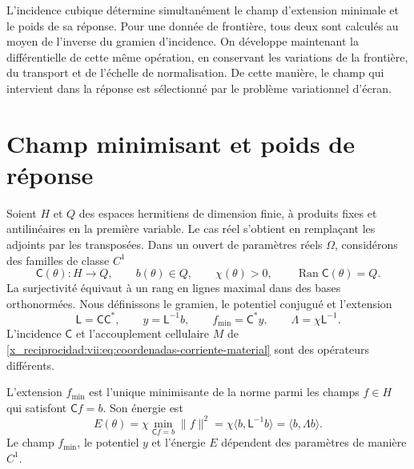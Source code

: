 L'incidence cubique détermine simultanément le champ d'extension
minimale et le poids de sa réponse. Pour une donnée de frontière, tous deux sont
calculés au moyen de l'inverse du gramien d'incidence. On développe
maintenant la différentielle de cette même opération, en conservant les variations
de la frontière, du transport et de l'échelle de normalisation. De cette
manière, le champ qui intervient dans la réponse est sélectionné par
le problème variationnel d'écran.

\section{Champ minimisant et poids de réponse}
\label{x_reciprocidad:vii:subsec:extension-minima-parametrizada}

Soient \(H\) et \(Q\) des espaces hermitiens de dimension finie, à produits fixes et antilinéaires en la première variable. Le cas réel s'obtient en remplaçant les adjoints par les transposées. Dans un ouvert de paramètres réels \(\Omega\), considérons des familles de classe \(C^1\)
\[
 \mathsf C(\theta):H\longrightarrow Q,\qquad
 b(\theta)\in Q,\qquad \chi(\theta)>0,
 \qquad \operatorname{Ran}\mathsf C(\theta)=Q.
\]
La surjectivité équivaut à un rang en lignes maximal dans des bases orthonormées. Nous définissons le gramien, le potentiel conjugué et l'extension
\begin{equation}
 \mathsf L=\mathsf C\mathsf C^*,\qquad
 y=\mathsf L^{-1}b,\qquad f_{\min}=\mathsf C^*y,
 \qquad \Lambda=\chi\mathsf L^{-1}.
 \label{x_reciprocidad:vii:eq:gramiano-extension-minima}
\end{equation}
L'incidence \(\mathsf C\) et l'accouplement cellulaire \(M\) de \eqref{x_reciprocidad:vii:eq:coordenadas-corriente-material} sont des opérateurs différents.

\begin{proposition}
\label{x_reciprocidad:vii:prop:minimo-parametrizado}
L'extension \(f_{\min}\) est l'unique minimisante de la norme parmi
les champs \(f\in H\) qui satisfont \(\mathsf C f=b\). Son énergie est
\begin{equation}
 E(\theta)=\chi\min_{\mathsf C f=b}\|f\|^2
 =\chi\langle b,\mathsf L^{-1}b\rangle
 =\langle b,\Lambda b\rangle.
 \label{x_reciprocidad:vii:eq:energia-extension-minima}
\end{equation}
Le champ \(f_{\min}\), le potentiel \(y\) et l'énergie \(E\)
dépendent des paramètres de manière \(C^1\).
\end{proposition}

